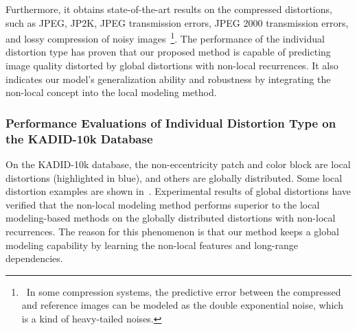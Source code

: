 	Furthermore, it obtains state-of-the-art results on the compressed distortions, such as JPEG, JP2K, JPEG transmission errors, JPEG 2000 transmission errors, and lossy compression of noisy images~\footnote{~In some compression systems, the predictive error between the compressed and reference images can be modeled as the double exponential noise, which is a kind of heavy-tailed noises.}. The performance of the individual distortion type has proven that our proposed method is capable of predicting image quality distorted by global distortions with non-local recurrences. It also indicates our model's generalization ability and robustness by integrating the non-local concept into the local modeling method.
	
	\subsubsection{Performance Evaluations of Individual Distortion Type on the KADID-10k Database}
	On the KADID-10k database, the non-eccentricity patch and color block are local distortions (highlighted in blue), and others are globally distributed. Some local distortion examples are shown in~. Experimental results of global distortions have verified that the non-local modeling method performs superior to the local modeling-based methods on the globally distributed distortions with non-local recurrences. The reason for this phenomenon is that our method keeps a global modeling capability by learning the non-local features and long-range dependencies.
